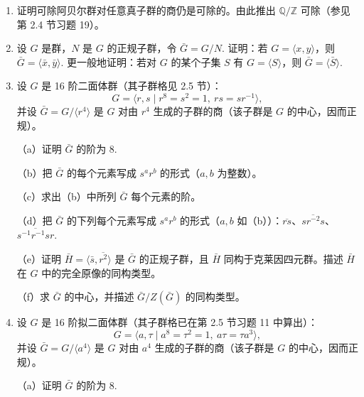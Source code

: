 \begin{enumerate}
（a）证明 \(\mathbb{Z}\) 在 \(\mathbb{Q}\) 中的每个陪集恰好含有一个满足 \(0 \leq q < 1\) 的代表元 \(q \in \mathbb{Q}\).

（b）证明 \(\mathbb{Q}/\mathbb{Z}\) 的每个元素都是有限阶的，但存在阶数任意大的元素。

（c）证明 \(\mathbb{Q}/\mathbb{Z}\) 是 \(\mathbb{R}/\mathbb{Z}\) 的挠子群（参见第 2.1 节习题 6）。

（d）证明 \(\mathbb{Q}/\mathbb{Z}\) 同构于 \(\mathbb{C}^\times\) 中的单位根乘法群。

\item 证明可除阿贝尔群对任意真子群的商仍是可除的。由此推出 \(\mathbb{Q}/\mathbb{Z}\) 可除（参见第 2.4 节习题 19）。

\item 设 \(G\) 是群，\(N\) 是 \(G\) 的正规子群，令 \(\bar{G} = G/N\). 证明：若 \(G = \langle x, y \rangle\)，则 \(\bar{G} = \langle \bar{x}, \bar{y} \rangle\). 更一般地证明：若对 \(G\) 的某个子集 \(S\) 有 \(G = \langle S \rangle\)，则 \(\bar{G} = \langle \bar{S} \rangle\).

\item 设 \(G\) 是 16 阶二面体群（其子群格见 2.5 节）：
\[
G = \langle r, s \mid r^8 = s^2 = 1,\ rs = sr^{-1} \rangle,
\]
并设 \(\bar{G} = G/\langle r^4 \rangle\) 是 \(G\) 对由 \(r^4\) 生成的子群的商（该子群是 \(G\) 的中心，因而正规）。

（a）证明 \(\bar{G}\) 的阶为 8.

（b）把 \(\bar{G}\) 的每个元素写成 \(s^a r^b\) 的形式（\(a, b\) 为整数）。

（c）求出（b）中所列 \(\bar{G}\) 每个元素的阶。

（d）把 \(\bar{G}\) 的下列每个元素写成 \(s^a r^b\) 的形式（\(a, b\) 如（b））：\(\overline{rs}\)、\(\overline{sr^{-2}s}\)、\(\overline{s^{-1}r^{-1}sr}\).

（e）证明 \(\bar{H} = \langle \bar{s}, \overline{r^2} \rangle\) 是 \(\bar{G}\) 的正规子群，且 \(\bar{H}\) 同构于克莱因四元群。描述 \(\bar{H}\) 在 \(G\) 中的完全原像的同构类型。

（f）求 \(\bar{G}\) 的中心，并描述 \(\bar{G}/Z(\bar{G})\) 的同构类型。

\item 设 \(G\) 是 16 阶拟二面体群（其子群格已在第 2.5 节习题 11 中算出）：
\[
G = \langle a, \tau \mid a^8 = \tau^2 = 1,\ a\tau = \tau a^3 \rangle,
\]
并设 \(\bar{G} = G/\langle a^4 \rangle\) 是 \(G\) 对由 \(a^4\) 生成的子群的商（该子群是 \(G\) 的中心，因而正规）。

（a）证明 \(\bar{G}\) 的阶为 8.


\end{enumerate}
